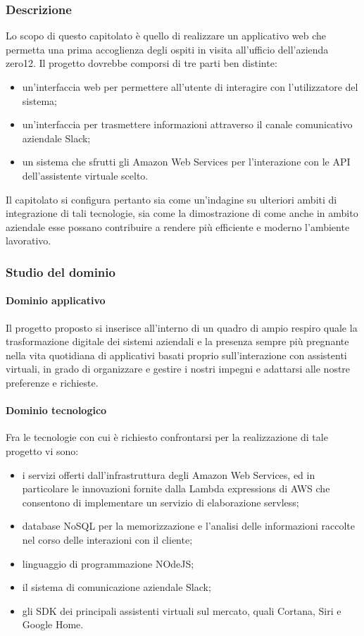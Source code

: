 		\subsubsection{Descrizione}
		Lo scopo di questo capitolato è quello di realizzare un applicativo web che permetta una prima accoglienza degli ospiti in visita all'ufficio 
		dell'azienda zero12. Il progetto dovrebbe comporsi di tre parti ben distinte: 
		\begin{itemize}
			\item un'interfaccia web per permettere all'utente di interagire con l'utilizzatore del sistema;
			\item un'interfaccia per trasmettere informazioni attraverso il canale comunicativo aziendale Slack;
			\item un sistema che sfrutti gli Amazon Web Services per l'interazione con le API dell'assistente virtuale scelto.
		\end{itemize}
		Il capitolato si configura pertanto sia come un'indagine su ulteriori ambiti di integrazione di tali tecnologie, sia come la dimostrazione 
		di come anche in ambito aziendale esse possano contribuire a rendere più efficiente e moderno l'ambiente lavorativo.
		\subsubsection{Studio del dominio}
			\paragraph{Dominio applicativo}
			Il progetto proposto si inserisce all'interno di un quadro di ampio respiro quale la trasformazione digitale dei sistemi aziendali e la 
			presenza sempre più pregnante nella vita quotidiana di applicativi basati proprio sull'interazione con assistenti virtuali, in grado di 
			organizzare e gestire i nostri impegni e adattarsi alle nostre preferenze e richieste.
			
			\paragraph{Dominio tecnologico}
			Fra le tecnologie con cui è richiesto confrontarsi per la realizzazione di tale progetto vi sono:
			\begin{itemize}
				\item i servizi offerti dall'infrastruttura degli Amazon Web Services, ed in particolare le innovazioni fornite dalla Lambda expressions 
				di AWS che consentono di implementare un servizio di elaborazione servless;
				\item database NoSQL per la memorizzazione e l'analisi delle informazioni raccolte nel corso delle interazioni con il cliente;
				\item linguaggio di programmazione NOdeJS;
				\item il sistema di comunicazione aziendale Slack;
				\item gli SDK dei principali assistenti virtuali sul mercato, quali Cortana, Siri e Google Home.
			\end{itemize}
